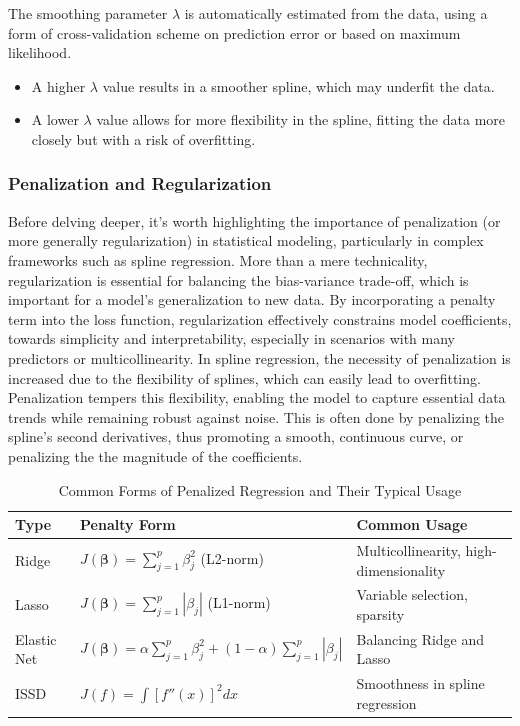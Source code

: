 \documentclass[12pt, twoside,hidelinks]{article}
\theoremstyle{definition}
\numberwithin{equation}{section}
\begin{document}
The smoothing parameter \( \lambda \) is automatically estimated from the data, using a form of cross-validation scheme on prediction error or based on maximum likelihood.

\begin{itemize}
    \item A higher \( \lambda \) value results in a smoother spline, which may underfit the data.
    \item A lower \( \lambda \) value allows for more flexibility in the spline, fitting the data more closely but with a risk of overfitting.
\end{itemize}

\subsubsection{Penalization and Regularization}\label{sec:smooth:penreg:penreg}

Before delving deeper, it's worth highlighting the importance of penalization (or more generally regularization) in statistical modeling, particularly in complex frameworks such as spline regression. More than a mere technicality, regularization is essential for balancing the bias-variance trade-off, which is important for a model's generalization to new data. By incorporating a penalty term into the loss function, regularization effectively constrains model coefficients, towards simplicity and interpretability, especially in scenarios with many predictors or multicollinearity. In spline regression, the necessity of penalization is increased due to the flexibility of splines, which can easily lead to overfitting. Penalization tempers this flexibility, enabling the model to capture essential data trends while remaining robust against noise. This is often done by penalizing the spline's second derivatives, thus promoting a smooth, continuous curve, or penalizing the the magnitude of the coefficients. 
\newline

\begin{table}[H]
\centering
\begin{tabular}{|l|l|l|}
\hline
\textbf{Type} & \textbf{Penalty Form} & \textbf{Common Usage} \\ \hline
Ridge & \( J(\boldsymbol{\beta}) = \sum_{j=1}^{p} \beta_j^2 \) (L2-norm) & Multicollinearity, high-dimensionality \\ \hline
Lasso & \( J(\boldsymbol{\beta}) = \sum_{j=1}^{p} |\beta_j| \) (L1-norm) & Variable selection, sparsity \\ \hline
Elastic Net & \( J(\boldsymbol{\beta}) = \alpha \sum_{j=1}^{p} \beta_j^2 + (1-\alpha) \sum_{j=1}^{p} |\beta_j| \) & Balancing Ridge and Lasso \\ \hline
ISSD & \( J(f) = \int [f''(x)]^2 dx \) & Smoothness in spline regression \\ \hline
\end{tabular}
\caption{Common Forms of Penalized Regression and Their Typical Usage}
\label{tab:penalized_regression}
\end{table}
\end{document}
